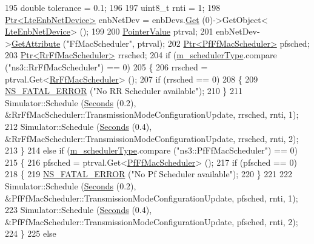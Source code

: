 \begin{DoxyCode}
195   \textcolor{keywordtype}{double} tolerance = 0.1;
196   
197   uint8\_t rnti = 1;
198   \hyperlink{classns3_1_1Ptr}{Ptr<LteEnbNetDevice>} enbNetDev = enbDevs.\hyperlink{classns3_1_1NetDeviceContainer_a677d62594b5c9d2dea155cc5045f4d0b}{Get} (0)->GetObject<
      \hyperlink{classns3_1_1LteEnbNetDevice}{LteEnbNetDevice}> ();
199   
200   \hyperlink{classns3_1_1PointerValue}{PointerValue} ptrval;
201   enbNetDev->\hyperlink{classns3_1_1ObjectBase_a895d1de2f96063d0e0fd78463e7a7e30}{GetAttribute} (\textcolor{stringliteral}{"FfMacScheduler"}, ptrval);
202   \hyperlink{classns3_1_1Ptr}{Ptr<PfFfMacScheduler>} pfsched;
203   \hyperlink{classns3_1_1Ptr}{Ptr<RrFfMacScheduler>} rrsched;
204   \textcolor{keywordflow}{if} (\hyperlink{classLenaMimoTestCase_a462839a0431fbfbc7650a5b1bfe1004c}{m\_schedulerType}.compare (\textcolor{stringliteral}{"ns3::RrFfMacScheduler"}) == 0)
205     \{
206       rrsched = ptrval.Get<\hyperlink{classns3_1_1RrFfMacScheduler}{RrFfMacScheduler}> ();
207       \textcolor{keywordflow}{if} (rrsched == 0)
208         \{
209           \hyperlink{group__fatal_ga5131d5e3f75d7d4cbfd706ac456fdc85}{NS\_FATAL\_ERROR} (\textcolor{stringliteral}{"No RR Scheduler available"});
210         \}
211       Simulator::Schedule (\hyperlink{group__timecivil_ga33c34b816f8ff6628e33d5c8e9713b9e}{Seconds} (0.2), &RrFfMacScheduler::TransmissionModeConfigurationUpdate, 
      rrsched, rnti, 1);
212       Simulator::Schedule (\hyperlink{group__timecivil_ga33c34b816f8ff6628e33d5c8e9713b9e}{Seconds} (0.4), &RrFfMacScheduler::TransmissionModeConfigurationUpdate, 
      rrsched, rnti, 2);
213     \}
214   \textcolor{keywordflow}{else} \textcolor{keywordflow}{if} (\hyperlink{classLenaMimoTestCase_a462839a0431fbfbc7650a5b1bfe1004c}{m\_schedulerType}.compare (\textcolor{stringliteral}{"ns3::PfFfMacScheduler"}) == 0)
215     \{
216       pfsched = ptrval.Get<\hyperlink{classns3_1_1PfFfMacScheduler}{PfFfMacScheduler}> ();
217       \textcolor{keywordflow}{if} (pfsched == 0)
218         \{
219           \hyperlink{group__fatal_ga5131d5e3f75d7d4cbfd706ac456fdc85}{NS\_FATAL\_ERROR} (\textcolor{stringliteral}{"No Pf Scheduler available"});
220         \}
221       
222       Simulator::Schedule (\hyperlink{group__timecivil_ga33c34b816f8ff6628e33d5c8e9713b9e}{Seconds} (0.2), &PfFfMacScheduler::TransmissionModeConfigurationUpdate, 
      pfsched, rnti, 1);
223       Simulator::Schedule (\hyperlink{group__timecivil_ga33c34b816f8ff6628e33d5c8e9713b9e}{Seconds} (0.4), &PfFfMacScheduler::TransmissionModeConfigurationUpdate, 
      pfsched, rnti, 2);
224     \}
225   \textcolor{keywordflow}{else}

\end{DoxyCode}
